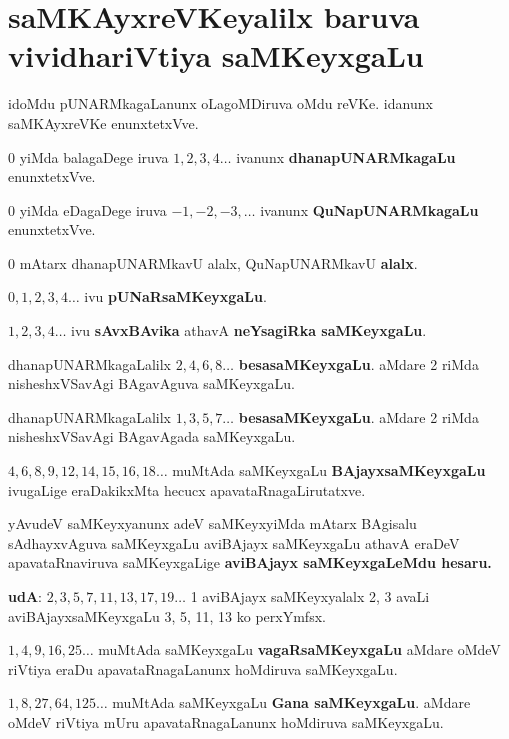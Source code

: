 \chapter{saMKAyxreVKeyalilx baruva vividhariVtiya saMKeyxgaLu}

\begin{figure}[!h]
\end{figure}
idoMdu pUNARMkagaLanunx oLagoMDiruva oMdu reVKe. idanunx saMKAyxreVKe enunxtetxVve.

$0$ yiMda balagaDege iruva $1,2,3,4\ldots$ ivanunx \textbf{dhanapUNARMkagaLu} enunxtetxVve.

$0$ yiMda eDagaDege iruva $-1, -2, -3, \ldots$ ivanunx \textbf{QuNapUNARMkagaLu} enunxtetxVve.

$0$ mAtarx dhanapUNARMkavU alalx, QuNapUNARMkavU \textbf{alalx}.

$0, 1, 2, 3, 4\ldots$ ivu \textbf{pUNaRsaMKeyxgaLu}.

$1, 2, 3, 4\ldots$ ivu \textbf{sAvxBAvika} athavA \textbf{neYsagiRka saMKeyxgaLu}.

dhanapUNARMkagaLalilx $2, 4, 6, 8\ldots$ \textbf{besasaMKeyxgaLu}. aMdare {\rm 2} riMda nisheshxVSavAgi BAgavAguva saMKeyxgaLu.

dhanapUNARMkagaLalilx $1, 3, 5, 7\ldots$ \textbf{besasaMKeyxgaLu}. aMdare {\rm 2} riMda nisheshxVSavAgi BAgavAgada saMKeyxgaLu.

$4, 6, 8, 9, 12, 14, 15, 16, 18\ldots$ muMtAda saMKeyxgaLu \textbf{BAjayxsaMKeyxgaLu} ivugaLige eraDakikxMta hecucx apavataRnagaLirutatxve.

yAvudeV saMKeyxyanunx adeV saMKeyxyiMda mAtarx BAgisalu sAdhayxvAguva saMKeyxgaLu aviBAjayx saMKeyxgaLu athavA eraDeV apavataRnaviruva saMKeyxgaLige \textbf{aviBAjayx saMKeyxgaLeMdu hesaru.}

\textbf{udA}: $2, 3, 5, 7, 11, 13, 17, 19 \ldots$ {\rm 1} aviBAjayx saMKeyxyalalx {\rm 2, 3} avaLi aviBAjayxsaMKeyxgaLu {\rm 3, 5}, {\rm 11, 13} ko perxYmfsx.

$1, 4, 9, 16, 25\ldots$ muMtAda saMKeyxgaLu \textbf{vagaRsaMKeyxgaLu} aMdare oMdeV riVtiya eraDu apavataRnagaLanunx hoMdiruva saMKeyxgaLu.

$1, 8, 27, 64, 125\ldots$ muMtAda saMKeyxgaLu \textbf{Gana saMKeyxgaLu}. aMdare oMdeV riVtiya mUru apavataRnagaLanunx hoMdiruva saMKeyxgaLu.

